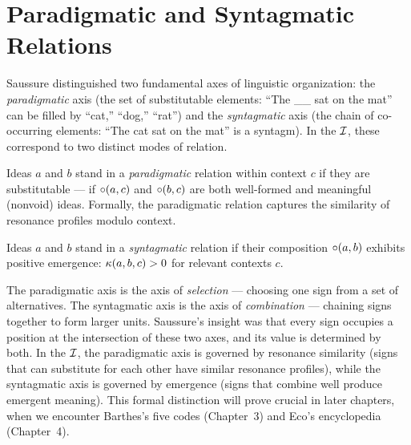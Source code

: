 \section{Paradigmatic and Syntagmatic Relations}

Saussure distinguished two fundamental axes of linguistic organization:
the \emph{paradigmatic} axis (the set of substitutable elements: ``The
\_\_ sat on the mat'' can be filled by ``cat,'' ``dog,'' ``rat'') and
the \emph{syntagmatic} axis (the chain of co-occurring elements: ``The
cat sat on the mat'' is a syntagm). In the $\mathcal{I}$, these correspond to
two distinct modes of relation.

\begin{definition}
\label{def:paradigmatic}
Ideas $a$ and $b$ stand in a \emph{paradigmatic} relation within
context $c$ if they are substitutable --- if $\circ(a, c)$ and
$\circ(b, c)$ are both well-formed and meaningful (nonvoid) ideas.
Formally, the paradigmatic relation captures the similarity of
resonance profiles modulo context.
\end{definition}

\begin{definition}
\label{def:syntagmatic}
Ideas $a$ and $b$ stand in a \emph{syntagmatic} relation if their
composition $\circ(a, b)$ exhibits positive emergence:
$\kappa(a, b, c) > 0$ for relevant contexts $c$.
\end{definition}

\begin{interpretation}
The paradigmatic axis is the axis of \emph{selection} --- choosing one
sign from a set of alternatives. The syntagmatic axis is the axis of
\emph{combination} --- chaining signs together to form larger units.
Saussure's insight was that every sign occupies a position at the
intersection of these two axes, and its value is determined by both.
In the $\mathcal{I}$, the paradigmatic axis is governed by resonance similarity
(signs that can substitute for each other have similar resonance
profiles), while the syntagmatic axis is governed by emergence (signs
that combine well produce emergent meaning). This formal distinction
will prove crucial in later chapters, when we encounter Barthes's
five codes (Chapter~3) and Eco's encyclopedia (Chapter~4).
\end{interpretation}

